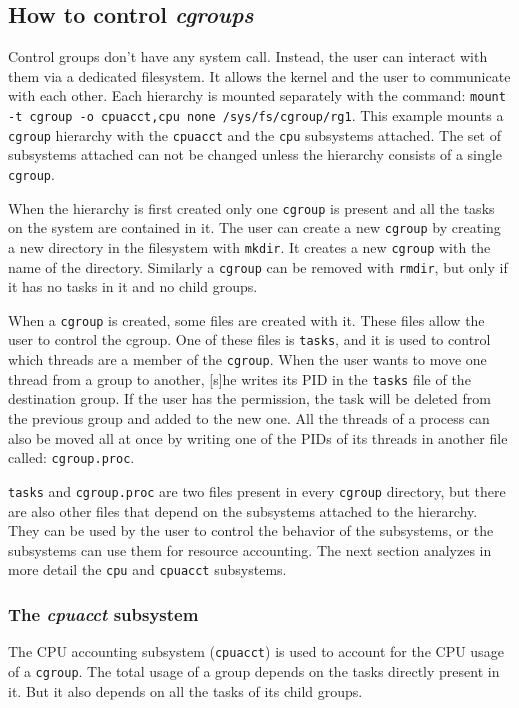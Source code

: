 \subsection{How to control \textit{cgroups}}
Control groups don't have any system call. Instead, the user can interact with them via a dedicated filesystem. It allows the kernel and the user to communicate with each other. Each hierarchy is mounted separately with the command: \verb|mount -t cgroup -o cpuacct,cpu none /sys/fs/cgroup/rg1|. \newline This example mounts a \verb|cgroup| hierarchy with the \verb|cpuacct| and the \verb|cpu| subsystems attached. The set of subsystems attached can not be changed unless the hierarchy consists of a single \verb|cgroup|.

When the hierarchy is first created only one \verb|cgroup| is present and all the tasks on the system are contained in it. The user can create a new \verb|cgroup| by creating a new directory in the filesystem with \verb|mkdir|. It creates a new \verb|cgroup| with the name of the directory. Similarly a \verb|cgroup| can be removed with \verb|rmdir|, but only if it has no tasks in it and no child groups. 

When a \verb|cgroup| is created, some files are created with it. These files allow the user to control the cgroup. One of these files is \verb|tasks|, and it is used to control which threads are a member of the \verb|cgroup|. When the user wants to move one thread from a group to another, [s]he writes its PID in the \verb|tasks| file of the destination group. If the user has the permission, the task will be deleted from the previous group and added to the new one. All the threads of a process can also be moved all at once by writing one of the PIDs of its threads in another file called: \verb|cgroup.proc|. 

\verb|tasks| and \verb|cgroup.proc| are two files present in every \verb|cgroup| directory, but there are also other files that depend on the subsystems attached to the hierarchy. They can be used by the user to control the behavior of the subsystems, or the subsystems can use them for resource accounting.  The next section analyzes in more detail the \verb|cpu| and \verb|cpuacct| subsystems.

\subsubsection{The \textit{cpuacct} subsystem}

The CPU accounting subsystem (\verb|cpuacct|) is used to account for the CPU usage of a \verb|cgroup|. The total usage of a group depends on the tasks directly present in it. But it also depends on all the tasks of its child groups.

